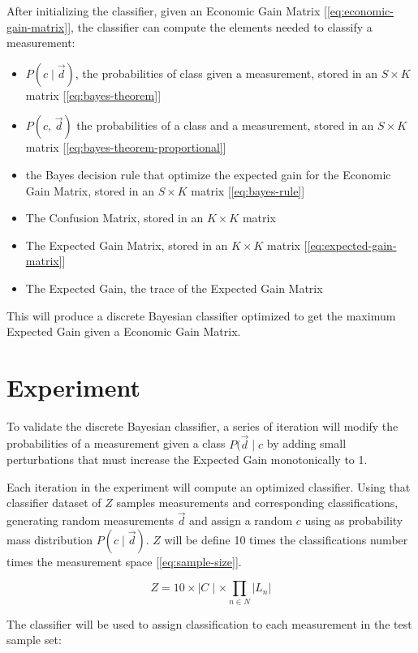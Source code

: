 \documentclass[letterpaper, conference]{IEEEtran}
\begin{document}
After initializing the classifier, given an Economic Gain Matrix [\ref{eq:economic-gain-matrix}], the classifier can compute the elements needed to classify a measurement:

\begin{itemize}
  \item $P(c \mid \vec{d})$, the probabilities of class given a measurement, stored in an $S \times K$ matrix [\ref{eq:bayes-theorem}]
  \item $P(c,\, \vec{d})$ the probabilities of a class and a measurement, stored in an $S \times K$ matrix [\ref{eq:bayes-theorem-proportional}]
  \item the Bayes decision rule that optimize the expected gain for the Economic Gain Matrix, stored in an $S \times K$ matrix [\ref{eq:bayes-rule}]
  \item The Confusion Matrix, stored in an $K \times K$ matrix
  \item The Expected Gain Matrix, stored in an $K \times K$ matrix [\ref{eq:expected-gain-matrix}]
  \item The Expected Gain, the trace of the Expected Gain Matrix
\end{itemize}

This will produce a discrete Bayesian classifier optimized to get the maximum Expected Gain given a Economic Gain Matrix.

\section{Experiment}

To validate the discrete Bayesian classifier, a series of iteration will modify the probabilities of a measurement given a class $P(\vec{d} \mid c$ by adding small perturbations that must increase the Expected Gain monotonically to 1.

Each iteration in the experiment will compute an optimized classifier. Using that classifier dataset of $Z$ samples measurements and corresponding classifications, generating random measurements $\vec{d}$ and assign a random $c$ using as probability mass distribution $P(c \mid \vec{d})$. $Z$ will be define 10 times the classifications number times the measurement space [\ref{eq:sample-size}].

\begin{equation}\label{eq:sample-size}
  Z = 10 \times \mid C \mid \times \prod_{n \in N} |L_n|
\end{equation}

The classifier will be used to assign classification to each measurement in the test sample set:
\end{document}

